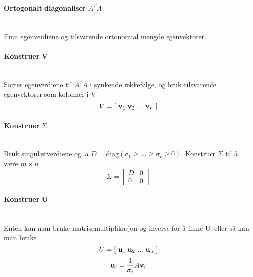 \paragraph{Ortogonalt diagonaliser $A^TA$} \hfill \\
Finn egenverdiene og tilsvarende ortonormal mengde egenvektorer.

\paragraph{Konstruer V} \hfill \\
Sorter egenverdiene til $A^TA$ i synkende rekkefølge,
og bruk tilsvarende egenvektorer som kolonner i V
$$V = [\ \vecv_1\ \vecv_2\ ...\  \vecv_n \ ]$$

\paragraph{Konstruer $\Sigma$} \hfill \\
Bruk singulærverdiene og la
$D = \text{diag}(\sigma_1 \geq ... \geq \sigma_r \geq 0)$.
Konstruer $\Sigma$ til å være $m\times n$
$$\Sigma = \begin{bmatrix} D & 0 \\ 0 & 0 \end{bmatrix}$$

\paragraph{Konstruer U} \hfill \\
Enten kan man bruke matrisemultiplikasjon og inverse for å finne U,
eller så kan man bruke
$$U = [\ \vecu_1\ \vecu_2\ ...\  \vecu_n \ ]$$
$$\mathbf{u}_i = \frac{1}{\sigma_i}A\mathbf{v}_i$$
